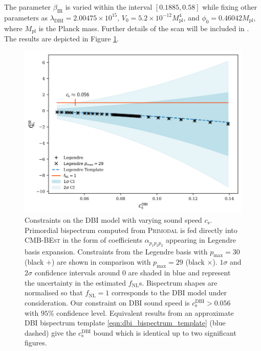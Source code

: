 The parameter $\beta_\text{IR}$ is varied within the interval $[0.1885,0.58]$ while fixing other parameters as $\lambda_\text{DBI} = 2.00475 \times 10^15$, $V_0 = 5.2 \times 10^{-12} M^4_\text{pl}$, and $\phi_0 = 0.46042 M_\text{pl}$, where $M_\text{pl}$ is the Planck mass. Further details of the scan will be included in \cite{Sohn2021inprep}. The results are depicted in Figure \ref{fig:dbi_sound_speed_scan}.

\begin{figure}[htbp!] 
	\centering    
	\includegraphics{dbi_sound_speed_scan_annotated.pdf}
	\caption{Constraints on the DBI model with varying sound speed $c_\text{s}$. Primordial bispectrum computed from \textsc{Primodal} is fed directly into \textsc{CMB-BEst} in the form of coefficients $\alpha_{p_1 p_2 p_3}$ appearing in Legendre basis expansion. Constraints from the Legendre basis with $p_\text{max}=30$ (black $+$) are shown in comparison with $p_\text{max}=29$ (black $\times$). $1\sigma$ and $2\sigma$ confidence intervals around $0$ are shaded in blue and represent the uncertainty in the estimated $f_\text{NL}$s. Bispectrum shapes are normalised so that $f_\text{NL}=1$ corresponds to the DBI model under consideration. Our constraint on DBI sound speed is $c^\text{DBI}_\text{s} > 0.056$ with $95\%$ confidence level. Equivalent results from an approximate DBI bispectrum template \eqref{eqn:dbi_bispectrum_template} (blue dashed) give the $c^\text{DBI}_\text{s}$ bound which is identical up to two significant figures.}
	\label{fig:dbi_sound_speed_scan}
\end{figure}


